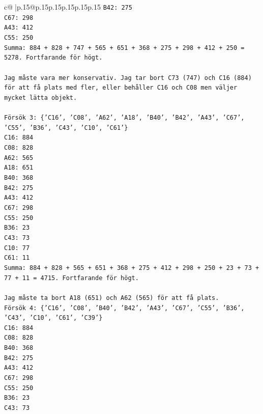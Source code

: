 \documentclass{article}
\begin{document}
{\begin{supertabular}{c@{$\;$}|p{.15\linewidth}@{}p{.15\linewidth}p{.15\linewidth}p{.15\linewidth}p{.15\linewidth}p{.15\linewidth}}
{{{\texttt{B42: 275} \\
\texttt{C67: 298} \\
\texttt{A43: 412} \\
\texttt{C55: 250} \\
\texttt{Summa: 884 + 828 + 747 + 565 + 651 + 368 + 275 + 298 + 412 + 250 = 5278. Fortfarande för högt.} \\
\\ 
\texttt{Jag måste vara mer konservativ. Jag tar bort C73 (747) och C16 (884) för att få plats med fler, eller behåller C16 och C08 men väljer mycket lätta objekt.} \\
\\ 
\texttt{Försök 3: \{'C16', 'C08', 'A62', 'A18', 'B40', 'B42', 'A43', 'C67', 'C55', 'B36', 'C43', 'C10', 'C61'\}} \\
\texttt{C16: 884} \\
\texttt{C08: 828} \\
\texttt{A62: 565} \\
\texttt{A18: 651} \\
\texttt{B40: 368} \\
\texttt{B42: 275} \\
\texttt{A43: 412} \\
\texttt{C67: 298} \\
\texttt{C55: 250} \\
\texttt{B36: 23} \\
\texttt{C43: 73} \\
\texttt{C10: 77} \\
\texttt{C61: 11} \\
\texttt{Summa: 884 + 828 + 565 + 651 + 368 + 275 + 412 + 298 + 250 + 23 + 73 + 77 + 11 = 4715. Fortfarande för högt.} \\
\\ 
\texttt{Jag måste ta bort A18 (651) och A62 (565) för att få plats.} \\
\texttt{Försök 4: \{'C16', 'C08', 'B40', 'B42', 'A43', 'C67', 'C55', 'B36', 'C43', 'C10', 'C61', 'C39'\}} \\
\texttt{C16: 884} \\
\texttt{C08: 828} \\
\texttt{B40: 368} \\
\texttt{B42: 275} \\
\texttt{A43: 412} \\
\texttt{C67: 298} \\
\texttt{C55: 250} \\
\texttt{B36: 23} \\
\texttt{C43: 73} \\
}}}
\end{supertabular}}
\end{document}
